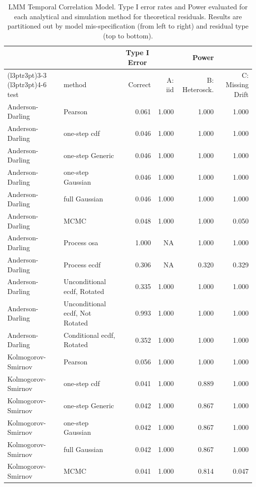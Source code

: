\documentclass[
]{article}
\begin{document}
\begin{table}[H]
\centering
\caption{\label{tab:randomwalk-lmm-theor}LMM Temporal Correlation Model. Type I error rates and Power evaluated for each analytical and simulation method for theoretical residuals. Results are partitioned out by model mis-specification (from left to right) and residual type (top to bottom).}
\centering
\begin{tabular}[t]{llrrrr}
\toprule
\multicolumn{1}{c}{ } & \multicolumn{1}{c}{ } & \multicolumn{1}{c}{Type I Error} & \multicolumn{3}{c}{Power} \\
\cmidrule(l{3pt}r{3pt}){3-3} \cmidrule(l{3pt}r{3pt}){4-6}
test & method & Correct & A: iid & B: Heterosck. & C: Missing Drift\\
\midrule
Anderson-Darling & Pearson & 0.061 & 1.000 & 1.000 & 1.000\\
Anderson-Darling & one-step cdf & 0.046 & 1.000 & 1.000 & 1.000\\
Anderson-Darling & one-step Generic & 0.046 & 1.000 & 1.000 & 1.000\\
Anderson-Darling & one-step Gaussian & 0.046 & 1.000 & 1.000 & 1.000\\
Anderson-Darling & full Gaussian & 0.046 & 1.000 & 1.000 & 1.000\\
\addlinespace
Anderson-Darling & MCMC & 0.048 & 1.000 & 1.000 & 0.050\\
Anderson-Darling & Process osa & 1.000 & NA & 1.000 & 1.000\\
Anderson-Darling & Process ecdf & 0.306 & NA & 0.320 & 0.329\\
Anderson-Darling & Unconditional ecdf, Rotated & 0.335 & 1.000 & 1.000 & 1.000\\
Anderson-Darling & Unconditional ecdf, Not Rotated & 0.993 & 1.000 & 1.000 & 1.000\\
\addlinespace
Anderson-Darling & Conditional ecdf, Rotated & 0.352 & 1.000 & 1.000 & 1.000\\
Kolmogorov- Smirnov & Pearson & 0.056 & 1.000 & 1.000 & 1.000\\
Kolmogorov- Smirnov & one-step cdf & 0.041 & 1.000 & 0.889 & 1.000\\
Kolmogorov- Smirnov & one-step Generic & 0.042 & 1.000 & 0.867 & 1.000\\
Kolmogorov- Smirnov & one-step Gaussian & 0.042 & 1.000 & 0.867 & 1.000\\
\addlinespace
Kolmogorov- Smirnov & full Gaussian & 0.042 & 1.000 & 0.867 & 1.000\\
Kolmogorov- Smirnov & MCMC & 0.041 & 1.000 & 0.814 & 0.047\\

\end{tabular}
\end{table}
\end{document}
